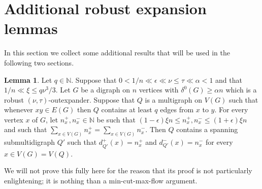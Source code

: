 \documentclass[10pt,letterpaper, reqno]{amsart}
\theoremstyle{definition}
\newtheorem{lemma}[thm]{Lemma}
\numberwithin{equation}{section}
\begin{document}
\section{Additional robust expansion lemmas}\label{RELemmas} In this section we collect some additional results that will be used in the following two sections. 

\begin{lemma}\label{5.2}
	Let $q \in \mathbb{N}$. Suppose that $0 < 1/n \ll \epsilon \ll \nu \leq \tau \ll \alpha < 1$ and that $1/n \ll  \xi \leq q\nu^3/3$. Let $G$ be a digraph on $n$ vertices with $\delta^0(G) \geq \alpha n$ which is a robust $(\nu,\tau)$-outexpander. Suppose that $Q$ is a multigraph on $V(G)$ such that whenever $xy \in E(G)$ then $Q$ contains at least $q$ edges from $x$ to $y$. For every vertex $x$ of $G$, let $n_x^+, n_x^- \in \mathbb{N}$ be such that $(1-\epsilon)\xi n \leq n_x^+, n_x^- \leq (1+\epsilon)\xi n$ and such that $\sum_{x \in V(G)}n_x^+ = \sum_{x \in V(G)} n_x^-$. Then $Q$ contains a spanning submultidigraph $Q'$ such that $d_{Q'}^+(x)=n_x^+$ and $d_{Q'}^-(x)=n_x^-$ for every $x \in V(G)=V(Q)$.
\end{lemma}

\noindent We will not prove this fully here for the reason that its proof is not particularly enlightening; it is nothing than a min-cut-max-flow argument.
\end{document}
